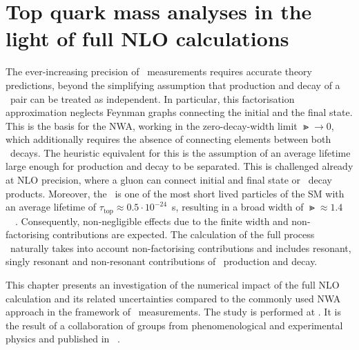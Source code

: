 \chapter{Top quark mass analyses in the light of full NLO calculations}
\label{chap:nlo}
%
The ever-increasing precision of \mt\ measurements requires accurate theory predictions, beyond the simplifying assumption that production and decay of a \tquark\ pair can be treated as independent.
%
In particular, this factorisation approximation neglects Feynman graphs connecting the initial and the final state. This is the basis for the \gls{NWA}, working in the zero-decay-width limit $\Gt\to0$, which additionally requires the absence of connecting elements between both \tquark\ decays. The heuristic equivalent for this is the assumption of an average lifetime large enough for production and decay to be separated. 
%
This is challenged already at \gls{NLO} precision, where a gluon can connect initial and final state or \tquark\ decay products. 
%
Moreover, the \tquark\ is one of the most short lived particles of the \gls{SM} with an average lifetime of $\tau_\mathrm{top} \approx 0.5 \cdot 10^{-24}$~s, resulting in a broad width of $\Gt\approx1.4$~\GeV~\cite{PDG2014}. 
%
Consequently, non-negligible effects due to the finite width and non-factorising contributions are expected. 
%
%
The calculation of the full process \ppWWbb\ naturally takes into account non-factorising contributions and includes resonant, singly resonant and non-resonant contributions of \tquark\ production and decay.

This chapter presents an investigation of the numerical impact of the full \gls{NLO} calculation and its related uncertainties compared to the commonly used \gls{NWA} approach in the framework of \mt\ measurements. The study is performed at \genlevel. It is the result of a collaboration of groups from phenomenological and experimental physics and published in ~\cite{Heinrich2014}. 


%















